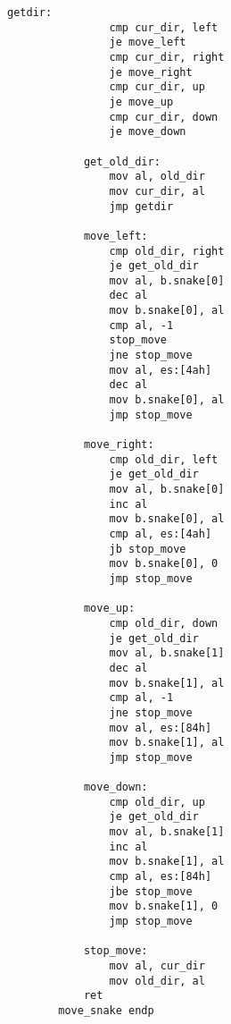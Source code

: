 \begin{itemize}
\begin{itemize}
\begin{lstlisting}[style=asm]
            getdir:                     
                cmp cur_dir, left
                je move_left
                cmp cur_dir, right
                je move_right
                cmp cur_dir, up
                je move_up
                cmp cur_dir, down
                je move_down
            
            get_old_dir:               
                mov al, old_dir
                mov cur_dir, al
                jmp getdir 
                
            move_left:                   
                cmp old_dir, right      
                je get_old_dir
                mov al, b.snake[0]      
                dec al                   
                mov b.snake[0], al       
                cmp al, -1               
                stop_move
                jne stop_move            
                mov al, es:[4ah]         
                dec al                  
                mov b.snake[0], al       
                jmp stop_move            
            
            move_right:                  
                cmp old_dir, left
                je get_old_dir
                mov al, b.snake[0]
                inc al
                mov b.snake[0], al
                cmp al, es:[4ah]
                jb stop_move
                mov b.snake[0], 0
                jmp stop_move
             
            move_up:                    
                cmp old_dir, down
                je get_old_dir
                mov al, b.snake[1]
                dec al
                mov b.snake[1], al
                cmp al, -1
                jne stop_move
                mov al, es:[84h]
                mov b.snake[1], al
                jmp stop_move 
                
            move_down:                   
                cmp old_dir, up
                je get_old_dir
                mov al, b.snake[1]
                inc al
                mov b.snake[1], al
                cmp al, es:[84h]
                jbe stop_move
                mov b.snake[1], 0
                jmp stop_move
            
            stop_move:                       
                mov al, cur_dir
                mov old_dir, al
            ret
        move_snake endp            
    \end{lstlisting}
    \vspace{0.3cm}
    

\end{itemize}
\end{itemize}
